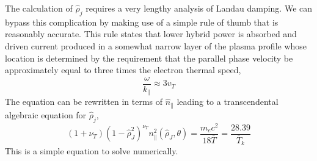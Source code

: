 The calculation of $\hat \rho_j$ requires a very lengthy analysis of Landau damping. We can bypass this complication by making use of a simple rule of thumb that is reasonably accurate. This rule states that lower hybrid power is absorbed and driven current produced in a somewhat narrow layer of the plasma profile whose location is determined by the requirement that the parallel phase velocity be approximately equal to three times the electron thermal speed,
\begin{equation}
	\frac { \omega } { k _ { \| } } \approx 3 v _ { T }
\end{equation}
The equation can be rewritten in terms of $\hat n_\parallel$ leading to a transcendental algebraic equation for $\hat \rho_j$,
\begin{equation}
	\left( 1 + \nu _ { T } \right) \left( 1 - \hat { \rho } _ { J } ^ { 2 } \right) ^ { \nu _ { T } } n _ { \| } ^ { 2 } \left( \hat { \rho } _ { J } , \theta \right) = \frac { m _ { e } c ^ { 2 } } { 18 \overline { T } } = \frac { 28.39 } { \overline { T } _ { k } }
\end{equation}
This is a simple equation to solve numerically.

